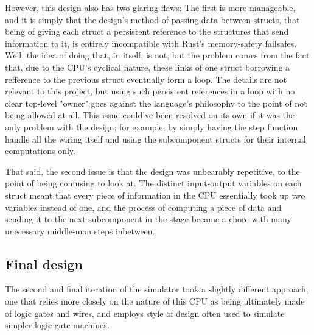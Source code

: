 \documentclass[12pt,twoside]{reedthesis}
\begin{document}
However, this design also has two glaring flaws: The first is more manageable, and it is simply that the design's method of passing data between structs, that being of giving each struct a persistent reference to the structures that send information to it, is entirely incompatible with Rust's memory-safety failsafes. Well, the idea of doing that, in itself, is not, but the problem comes from the fact that, due to the CPU's cyclical nature, these links of one struct borrowing a refference to the previous struct eventually form a loop. The details are not relevant to this project, but using such persistent references in a loop with no clear top-level "owner" goes against the language's philosophy to the point of not being allowed at all. This issue could've been resolved on its own if it was the only problem with the design; for example, by simply having the step function handle all the wiring itself and using the subcomponent structs for their internal computations only.

That said, the second issue is that the design was unbearably repetitive, to the point of being confusing to look at. The distinct input-output variables on each struct meant that every piece of information in the CPU essentially took up two variables instead of one, and the process of computing a piece of data and sending it to the next subcomponent in the stage became a chore with many unecessary middle-man steps inbetween.

\subsection{Final design}

The second and final iteration of the simulator took a slightly different approach, one that relies more closely on the nature of this CPU as being ultimately made of logic gates and wires, and employs style of design often used to simulate simpler logic gate machines.
\end{document}
